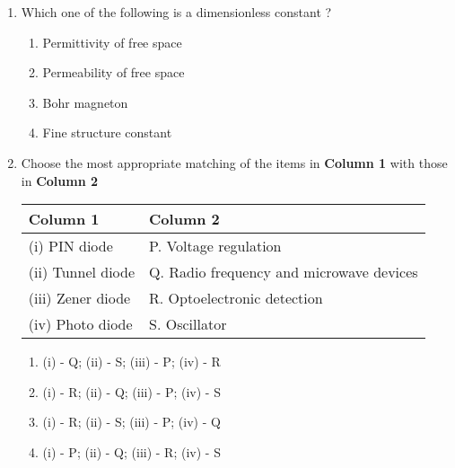 \documentclass[article]{IEEEtran}
\numberwithin{figure}{enumi}
\begin{document}
\begin{enumerate}
\item Which one of the following is a dimensionless constant ?
\begin{enumerate}
    \item Permittivity of free space
    \item Permeability of free space
    \item Bohr magneton
    \item Fine structure constant
\end{enumerate}
\item Choose the most appropriate matching of the items in \textbf{Column 1} with those in
\textbf{Column 2}\\
\begin{table}[h]
    \centering
    \begin{tabular}{|l|l|}
        \hline
        \textbf{Column 1} & \textbf{Column 2} \\
        \hline
        (i) PIN diode &     P. Voltage regulation \\
        (ii) Tunnel diode & Q. Radio frequency and microwave devices \\
        (iii) Zener diode & R. Optoelectronic detection \\
        (iv) Photo diode &  S. Oscillator \\
        \hline
    \end{tabular}
\end{table}
\begin{enumerate}
    \item (i) - Q; (ii) - S; (iii) - P; (iv) - R
    \item (i) - R; (ii) - Q; (iii) - P; (iv) - S
    \item (i) - R; (ii) - S; (iii) - P; (iv) - Q
    \item (i) - P; (ii) - Q; (iii) - R; (iv) - S
\end{enumerate}

\end{enumerate}
\end{document}
